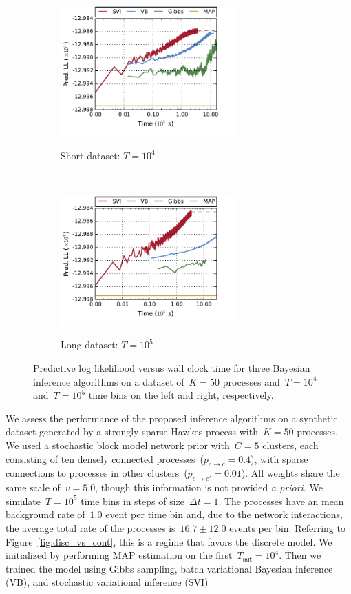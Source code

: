 \begin{figure}[t!]
  \begin{center}
    \begin{subfigure}[b]{0.48\linewidth}
      \caption{Short dataset: $T=10^4$}
      \centering
      \includegraphics[width=2.625in]{figures/ch2b/figure2a.pdf} 
      \label{fig:synth_pll_short}
    \end{subfigure}
    ~
    \begin{subfigure}[b]{0.48\linewidth}
      \caption{Long dataset: $T=10^5$}
      \centering
      \includegraphics[width=2.625in]{figures/ch2b/figure2b.pdf} 
      \label{fig:synth_pll_long}
    \end{subfigure}
    \caption[Predictive log likelihood versus wall clock time]{
      Predictive log likelihood versus wall clock time for three Bayesian inference algorithms on a dataset of~$K=50$ processes and~$T=10^4$ and~$T=10^5$ time bins on the left and right, respectively.}
    \label{fig:synth_pll}
  \end{center}
\end{figure}


We assess the performance of the proposed inference algorithms on a synthetic dataset generated by a strongly sparse Hawkes process with~${K=50}$ processes.
We used a stochastic block model network prior with~${C=5}$ clusters, each consisting of ten densely connected processes~(${p_{c\to c}=0.4}$), with sparse connections to processes in other clusters~(${p_{c\to c'}=0.01}$).
All weights share the same scale of~$v=5.0$, though this information is not provided \emph{a priori}.
We simulate~${T=10^5}$ time bins in steps of size~${\Delta t=1}$.
The processes have an mean background rate of~$1.0$ event per time bin and, due to the network interactions, the average total rate of the processes is~$16.7 \pm 12.0$ events per bin.
Referring to Figure~\ref{fig:disc_vs_cont}, this is a regime that favors the discrete model.
We initialized by performing MAP estimation on the first~$T_{\mathsf{init}}=10^4$.
Then we trained the model using Gibbs sampling, batch variational Bayesian inference (VB), and stochastic variational inference (SVI) 

